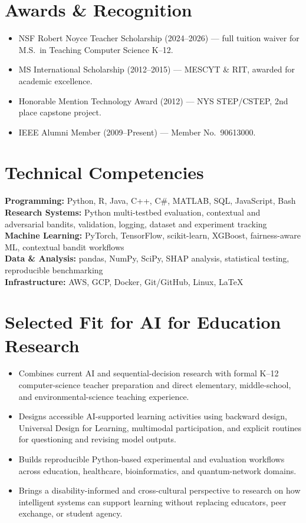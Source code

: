 \documentclass[10pt]{article}
\begin{document}
\section{Awards \& Recognition}
\begin{itemize}
  \item NSF Robert Noyce Teacher Scholarship (2024--2026) --- full tuition waiver for M.S.\ in Teaching Computer Science K--12.
  \item MS International Scholarship (2012--2015) --- MESCYT \& RIT, awarded for academic excellence.
  \item Honorable Mention Technology Award (2012) --- NYS STEP/CSTEP, 2nd place capstone project.
  \item IEEE Alumni Member (2009--Present) --- Member No.\ 90613000.
\end{itemize}

\section{Technical Competencies}
\textbf{Programming:} Python, R, Java, C++, C\#, MATLAB, SQL, JavaScript, Bash\\
\textbf{Research Systems:} Python multi-testbed evaluation, contextual and adversarial bandits, validation, logging, dataset and experiment tracking\\
\textbf{Machine Learning:} PyTorch, TensorFlow, scikit-learn, XGBoost, fairness-aware ML, contextual bandit workflows\\
\textbf{Data \& Analysis:} pandas, NumPy, SciPy, SHAP analysis, statistical testing, reproducible benchmarking\\
\textbf{Infrastructure:} AWS, GCP, Docker, Git/GitHub, Linux, LaTeX

\section{Selected Fit for AI for Education Research}
\begin{itemize}
  \item Combines current AI and sequential-decision research with formal K--12 computer-science teacher preparation and direct elementary, middle-school, and environmental-science teaching experience.
  \item Designs accessible AI-supported learning activities using backward design, Universal Design for Learning, multimodal participation, and explicit routines for questioning and revising model outputs.
  \item Builds reproducible Python-based experimental and evaluation workflows across education, healthcare, bioinformatics, and quantum-network domains.
  \item Brings a disability-informed and cross-cultural perspective to research on how intelligent systems can support learning without replacing educators, peer exchange, or student agency.
\end{itemize}
\end{document}
